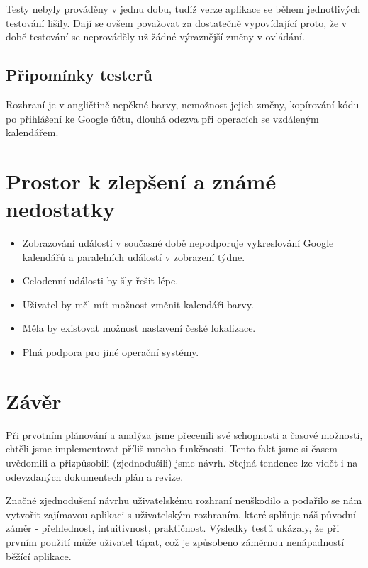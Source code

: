 \documentclass[a4paper, 12pt]{article}[7.12.2013]
\begin{document}
Testy nebyly prováděny v jednu dobu, tudíž verze aplikace se během jednotlivých testování lišily. Dají se ovšem považovat za dostatečně vypovídající proto, že v době testování se neprováděly už žádné výraznější změny v ovládání.

\subsection{Připomínky testerů}
Rozhraní je v angličtině nepěkné barvy, nemožnost jejich změny, kopírování kódu po přihlášení ke Google účtu, dlouhá odezva při operacích se vzdáleným kalendářem.

\section{Prostor k zlepšení a známé nedostatky}
\begin{itemize}
    \item Zobrazování událostí v současné době nepodporuje vykreslování Google kalendářů a paralelních událostí v zobrazení týdne.
    \item Celodenní události by šly řešit lépe.
    \item Uživatel by měl mít možnost změnit kalendáři barvy.
    \item Měla by existovat možnost nastavení české lokalizace.
    \item Plná podpora pro jiné operační systémy.
\end{itemize}

\section{Závěr}
Při prvotním plánování a analýza jsme přecenili své schopnosti a časové možnosti, chtěli jsme implementovat příliš mnoho funkčnosti. Tento fakt jsme si časem uvědomili a přizpůsobili (zjednodušili) jsme návrh. Stejná tendence lze vidět i na odevzdaných dokumentech plán a revize.

Značné zjednodušení návrhu uživatelskému rozhraní neuškodilo a podařilo se nám vytvořit zajímavou aplikaci s uživatelským rozhraním, které splňuje náš původní záměr - přehlednost, intuitivnost, praktičnost. Výsledky testů ukázaly, že při prvním použití může uživatel tápat, což je způsobeno záměrnou nenápadností běžící aplikace.
\end{document}
